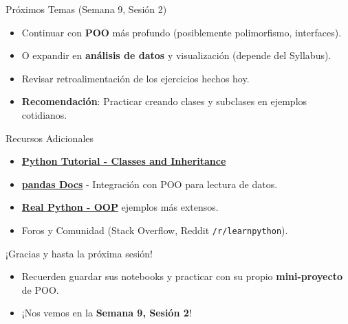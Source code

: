 \documentclass[10pt]{beamer}
\begin{document}
\begin{frame}{Próximos Temas (Semana 9, Sesión 2)}
  \begin{itemize}
    \item Continuar con \textbf{POO} más profundo (posiblemente polimorfismo, interfaces).
    \item O expandir en \textbf{análisis de datos} y visualización (depende del Syllabus).
    \item Revisar retroalimentación de los ejercicios hechos hoy.
    \item \textbf{Recomendación}: Practicar creando clases y subclases en ejemplos cotidianos.
  \end{itemize}
\end{frame}

\begin{frame}{Recursos Adicionales}
  \begin{itemize}
    \item \href{https://docs.python.org/3/tutorial/classes.html}{\textbf{Python Tutorial - Classes and Inheritance}}
    \item \href{https://pandas.pydata.org/}{\textbf{pandas Docs}} - Integración con POO para lectura de datos.
    \item \href{https://realpython.com/python3-object-oriented-programming/}{\textbf{Real Python - OOP}} ejemplos más extensos.
    \item Foros y Comunidad (Stack Overflow, Reddit \texttt{/r/learnpython}).
  \end{itemize}
\end{frame}

\begin{frame}
  \Huge{\centerline{¡Gracias y hasta la próxima sesión!}}
  \vspace{0.4cm}
  \normalsize
  \begin{itemize}
    \item Recuerden guardar sus notebooks y practicar con su propio \textbf{mini-proyecto} de POO.
    \item ¡Nos vemos en la \textbf{Semana 9, Sesión 2}!
  \end{itemize}
\end{frame}
\end{document}
